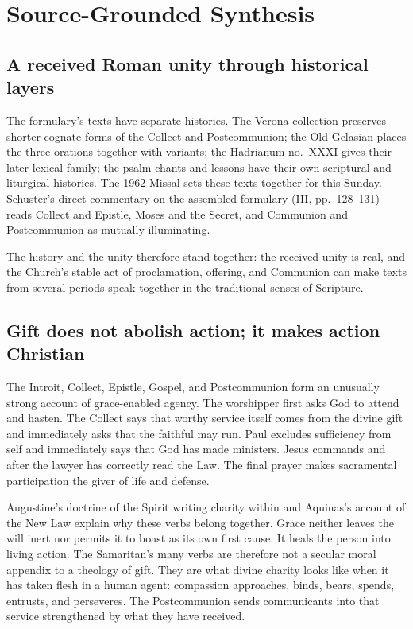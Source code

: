 \sectionguard
\section*{Source-Grounded Synthesis}

\subsection*{A received Roman unity through historical layers}

The formulary's texts have separate histories.
\ifdefined\TriptychSynthesisEdition\else
The Verona collection preserves shorter cognate forms of the Collect and
Postcommunion; the Old Gelasian places the three orations together with
variants; the Hadrianum no.~XXXI gives their later lexical family; the psalm
chants and lessons have their own scriptural and liturgical histories.
\fi
The 1962 Missal sets these texts together for this Sunday. Schuster's direct commentary on the assembled
formulary (III, pp.~128--131) reads Collect and Epistle, Moses and the
Secret, and Communion and Postcommunion as mutually illuminating.

The history and the unity therefore stand together: the received unity is
real, and the Church's stable act of proclamation, offering, and
Communion can make texts from several periods speak together in the traditional
senses of Scripture.

\subsection*{Gift does not abolish action; it makes action Christian}

The Introit, Collect, Epistle, Gospel, and Postcommunion form an unusually
strong account of grace-enabled agency. The worshipper first asks God to
attend and hasten. The Collect says that worthy service itself comes from the
divine gift and immediately asks that the faithful may run. Paul excludes
sufficiency from self and immediately says that God has made ministers. Jesus
commands  and  after the lawyer has correctly read the
Law. The final prayer makes sacramental participation the giver of life and
defense.

Augustine's doctrine of the Spirit writing charity within and Aquinas's account
of the New Law explain why these verbs belong together. Grace neither leaves
the will inert nor permits it to boast as its own first cause. It heals the
person into living action. The Samaritan's many verbs are therefore not a
secular moral appendix to a theology of gift. They are what divine charity
looks like when it has taken flesh in a human agent: compassion approaches,
binds, bears, spends, entrusts, and perseveres. The Postcommunion sends
communicants into that service strengthened by what they have received.


